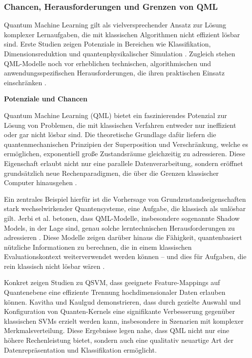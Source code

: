 \subsubsection{Chancen, Herausforderungen und Grenzen von QML}
Quantum Machine Learning gilt als vielversprechender Ansatz zur Lösung komplexer Lernaufgaben, die mit klassischen Algorithmen nicht effizient lösbar sind. Erste Studien zeigen Potenziale in Bereichen wie Klassifikation, Dimensionsreduktion und quantenphysikalischer Simulation \citep{jerbiShadowsQuantumMachine2024} \cite{peralGarcia2024}. Zugleich stehen QML-Modelle noch vor erheblichen technischen, algorithmischen und anwendungsspezifischen Herausforderungen, die ihren praktischen Einsatz einschränken \cite{uddin2024, gujju2024} \citep{gujjuQuantumMachineLearning2024}.


\vspace{1em}
\noindent\textbf{Potenziale und Chancen}

\noindent
Quantum Machine Learning (QML) bietet ein faszinierendes Potenzial zur Lösung von Problemen, die mit klassischen Verfahren entweder nur ineffizient oder gar nicht lösbar sind. Die theoretische Grundlage dafür liefern die quantenmechanischen Prinzipien der Superposition und Verschränkung, welche es ermöglichen, exponentiell große Zustandsräume gleichzeitig zu adressieren. Diese Eigenschaft erlaubt nicht nur eine parallele Datenverarbeitung, sondern eröffnet grundsätzlich neue Rechenparadigmen, die über die Grenzen klassischer Computer hinausgehen \cite{peralGarcia2024}.

Ein zentrales Beispiel hierfür ist die Vorhersage von Grundzustandseigenschaften stark wechselwirkender Quantensysteme, eine Aufgabe, die klassisch als unlösbar gilt. Jerbi et al. \cite{jerbi2024} betonen, dass QML-Modelle, insbesondere sogenannte Shadow Models, in der Lage sind, genau solche lerntechnischen Herausforderungen zu adressieren \cite[1]{jerbi2024}. Diese Modelle zeigen darüber hinaus die Fähigkeit, quantenbasiert nützliche Informationen zu berechnen, die in einem klassischen Evaluationskontext weiterverwendet werden können – und dies für Aufgaben, die rein klassisch nicht lösbar wären \cite[6]{jerbi2024}.

Konkret zeigen Studien zu QSVM, dass geeignete Feature-Mappings auf Quantenebene eine effiziente Trennung hochdimensionaler Daten erlauben können. Kavitha und Kaulgud \cite{kavitha2024} demonstrieren, dass durch gezielte Auswahl und Konfiguration von Quanten-Kernels eine signifikante Verbesserung gegenüber klassischen SVMs erzielt werden kann, insbesondere in Szenarien mit komplexer Merkmalsverteilung. Diese Ergebnisse legen nahe, dass QML nicht nur eine höhere Rechenleistung bietet, sondern auch eine qualitativ neuartige Art der Datenrepräsentation und Klassifikation ermöglicht.

